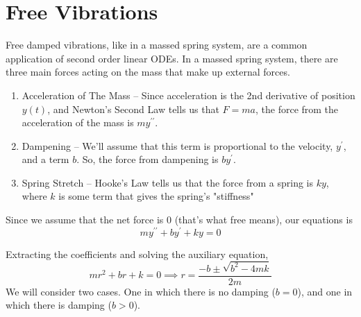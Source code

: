 \section{Free Vibrations}
\noindent
Free damped vibrations, like in a massed spring system, are a common application of second order linear ODEs. In a massed spring system, there are three main forces acting on the mass that make up external forces.
\begin{enumerate}[label=\arabic*)]
	\item Acceleration of The Mass -- Since acceleration is the 2nd derivative of position $y(t)$, and Newton's Second Law tells us that $F = ma$, the force from the acceleration of the mass is $my^{\prime\prime}$.
	\item Dampening -- We'll assume that this term is proportional to the velocity, $y^\prime$, and a term $b$. So, the force from dampening is $by^\prime$.
	\item Spring Stretch -- Hooke's Law tells us that the force from a spring is $ky$, where $k$ is some term that gives the spring's "stiffness"
\end{enumerate}
Since we assume that the net force is 0 (that's what free means), our equations is
\begin{equation*}
	my^{\prime\prime} + by^\prime + ky = 0
\end{equation*}

\noindent
Extracting the coefficients and solving the auxiliary equation,
\begin{equation*}
	mr^2 + br + k = 0 \implies r = \frac{-b \pm \sqrt{b^2 - 4mk}}{2m}
\end{equation*}
We will consider two cases. One in which there is no damping ($b = 0$), and one in which there is damping ($b > 0$).


